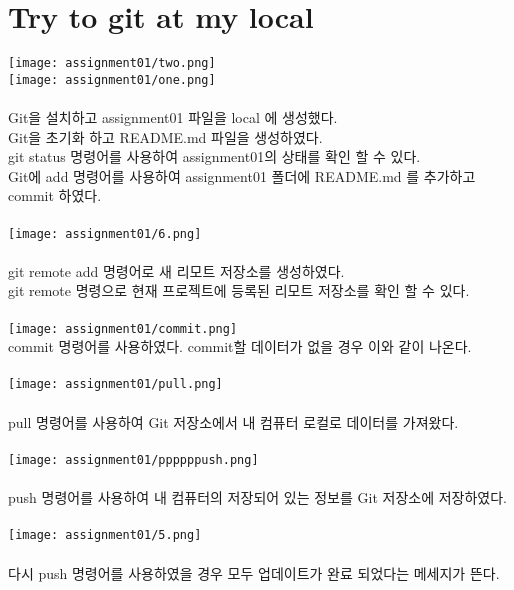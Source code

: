 \documentclass{article}
\begin{document}
\section{Try to git at my local}
 
 
\maketitle

\texttt{[image: assignment01/two.png]}
\\
\texttt{[image: assignment01/one.png]}
\\
\\
Git을 설치하고 assignment01 파일을 local 에 생성했다.
\\
Git을 초기화 하고 README.md 파일을 생성하였다.
\\
git status 명령어를 사용하여 assignment01의 상태를 확인 할 수 있다.
\\
Git에 add 명령어를 사용하여 assignment01 폴더에 README.md 를 추가하고 commit 하였다.
\\
\\
\texttt{[image: assignment01/6.png]}
\\
\\
git remote add 명령어로 새 리모트 저장소를 생성하였다.
\\
git remote 명령으로 현재 프로젝트에 등록된 리모트 저장소를 확인 할 수 있다.
\\
\\
\texttt{[image: assignment01/commit.png]}
\\
commit 명령어를 사용하였다. commit할 데이터가 없을 경우 이와 같이 나온다.
\\
\\
\texttt{[image: assignment01/pull.png]}
\\
\\
pull 명령어를 사용하여 Git 저장소에서 내 컴퓨터 로컬로 데이터를 가져왔다.
\\
\\
\texttt{[image: assignment01/ppppppush.png]}
\\
\\
push 명령어를 사용하여 내 컴퓨터의 저장되어 있는 정보를 Git 저장소에 저장하였다.
\\
\\
\texttt{[image: assignment01/5.png]}
\\
\\
다시 push 명령어를 사용하였을 경우 모두 업데이트가 완료 되었다는 메세지가 뜬다.
\end{document}
